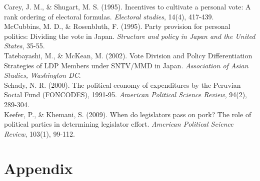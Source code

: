 \documentclass{article}
\begin{document}
Carey, J. M., & Shugart, M. S. (1995). Incentives to cultivate a personal vote: A rank ordering of electoral formulas. \textit{Electoral studies}, 14(4), 417-439.\\

McCubbins, M. D., & Rosenbluth, F. (1995). Party provision for personal politics: Dividing the vote in Japan. \textit{Structure and policy in Japan and the United States}, 35-55.\\

Tatebayashi, M., & McKean, M. (2002). Vote Division and Policy Differentiation Strategies of LDP Members under SNTV/MMD in Japan. \textit{Association of Asian Studies, Washington DC}.\\

Schady, N. R. (2000). The political economy of expenditures by the Peruvian Social Fund (FONCODES), 1991-95. \textit{American Political Science Review}, 94(2), 289-304.\\

Keefer, P., \& Khemani, S. (2009). When do legislators pass on pork? The role of political parties in determining legislator effort. \textit{American Political Science Review}, 103(1), 99-112.
\section{Appendix} 
\end{document}
